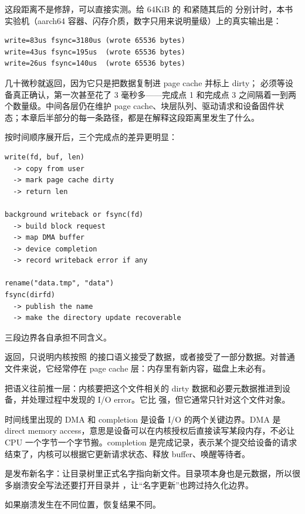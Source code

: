 这段距离不是修辞，可以直接实测。给 64KiB 的  和紧随其后的  分别计时，本书实验机（aarch64 容器、闪存介质，数字只用来说明量级）上的真实输出是：

\begin{lstlisting}
write=83us fsync=3180us (wrote 65536 bytes)
write=43us fsync=195us  (wrote 65536 bytes)
write=26us fsync=140us  (wrote 65536 bytes)
\end{lstlisting}

 几十微秒就返回，因为它只是把数据复制进 page cache 并标上 dirty； 必须等设备真正确认，第一次甚至花了 3 毫秒多——完成点 1 和完成点 3 之间隔着一到两个数量级。中间各层仍在维护 page cache、块层队列、驱动请求和设备固件状态；本章后半部分的每一条路径，都是在解释这段距离里发生了什么。

按时间顺序展开后，三个完成点的差异更明显：

\begin{lstlisting}
write(fd, buf, len)
  -> copy from user
  -> mark page cache dirty
  -> return len

background writeback or fsync(fd)
  -> build block request
  -> map DMA buffer
  -> device completion
  -> record writeback error if any

rename("data.tmp", "data")
fsync(dirfd)
  -> publish the name
  -> make the directory update recoverable
\end{lstlisting}

三段边界各自承担不同含义。

 返回，只说明内核按照  的接口语义接受了数据，或者接受了一部分数据。对普通文件来说，它经常停在 page cache 层：内存里有新内容，磁盘上未必有。

 把语义往前推一层：内核要把这个文件相关的 dirty 数据和必要元数据推进到设备，并处理过程中发现的 I/O error。它比  强，但它通常只针对这个文件对象。

时间线里出现的 DMA 和 completion 是设备 I/O 的两个关键边界。DMA 是 direct memory access，意思是设备可以在内核授权后直接读写某段内存，不必让 CPU 一个字节一个字节搬。completion 是完成记录，表示某个提交给设备的请求结束了，内核可以根据它更新请求状态、释放 buffer、唤醒等待者。

 是发布新名字：让目录树里正式名字指向新文件。目录项本身也是元数据，所以很多崩溃安全写法还要打开目录并 ，让“名字更新”也跨过持久化边界。

如果崩溃发生在不同位置，恢复结果不同。

